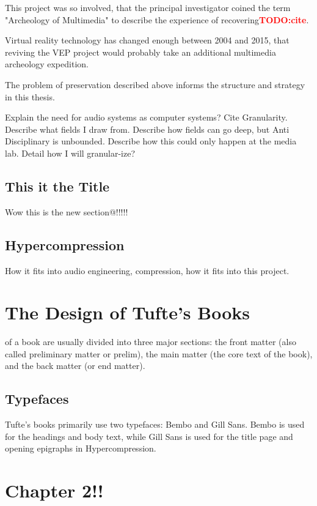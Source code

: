 \documentclass{tufte-book}
\newcommand{\TODO}[1]{\textcolor{red}{\bf TODO:#1}\xspace}
\newcommand{\thesis}{Hypercompression\xspace}
\begin{document}
This project was so involved, that the principal investigator coined
the term "Archeology of Multimedia" to describe the experience of
recovering\TODO{cite}.

Virtual reality technology has changed enough between 2004 and 2015,
that reviving the VEP project would probably take an additional
multimedia archeology expedition.

The problem of preservation described above informs the structure and
strategy in this thesis. 

Explain the need for audio systems as computer systems? Cite
Granularity. Describe what fields I draw from. Describe how fields can
go deep, but Anti Disciplinary is unbounded. Describe how this could
only happen at the media lab. Detail how I will granular-ize?

\section{This it the Title}
\label{sec:this-it-title}
Wow this is the new section@!!!!!


\section{Hypercompression}
How it fits into audio engineering, compression, how it fits into this project. 


\chapter{The Design of Tufte's Books}
\label{ch:tufte-design}


 of a book are usually divided into three major
sections: the front matter (also called preliminary matter or prelim), the
main matter (the core text of the book), and the back matter (or end
matter).

\section{Typefaces}\label{sec:typefaces1}

Tufte's books primarily use two typefaces: Bembo and Gill Sans.  Bembo is used
for the headings and body text, while Gill Sans is used for the title page and
opening epigraphs in \thesis.

\chapter[Chapter2]{Chapter 2!!}
\label{ch:ch2}
\end{document}
